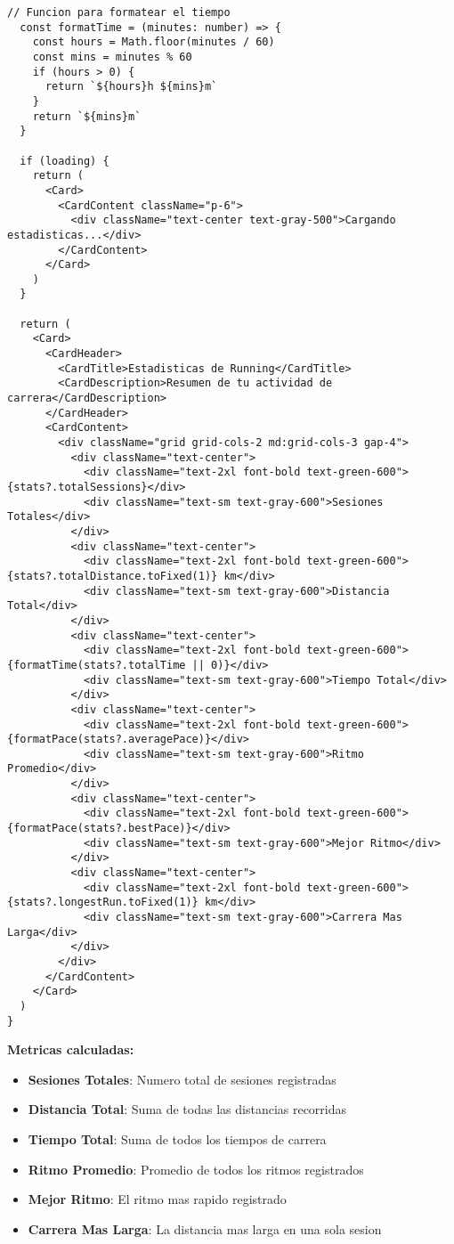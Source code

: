 \documentclass[12pt,a4paper]{article}
\begin{document}
\begin{lstlisting}[caption=components/running/running-stats.tsx - Logica de calculo]
  // Funcion para formatear el tiempo
  const formatTime = (minutes: number) => {
    const hours = Math.floor(minutes / 60)
    const mins = minutes % 60
    if (hours > 0) {
      return `${hours}h ${mins}m`
    }
    return `${mins}m`
  }

  if (loading) {
    return (
      <Card>
        <CardContent className="p-6">
          <div className="text-center text-gray-500">Cargando estadisticas...</div>
        </CardContent>
      </Card>
    )
  }

  return (
    <Card>
      <CardHeader>
        <CardTitle>Estadisticas de Running</CardTitle>
        <CardDescription>Resumen de tu actividad de carrera</CardDescription>
      </CardHeader>
      <CardContent>
        <div className="grid grid-cols-2 md:grid-cols-3 gap-4">
          <div className="text-center">
            <div className="text-2xl font-bold text-green-600">{stats?.totalSessions}</div>
            <div className="text-sm text-gray-600">Sesiones Totales</div>
          </div>
          <div className="text-center">
            <div className="text-2xl font-bold text-green-600">{stats?.totalDistance.toFixed(1)} km</div>
            <div className="text-sm text-gray-600">Distancia Total</div>
          </div>
          <div className="text-center">
            <div className="text-2xl font-bold text-green-600">{formatTime(stats?.totalTime || 0)}</div>
            <div className="text-sm text-gray-600">Tiempo Total</div>
          </div>
          <div className="text-center">
            <div className="text-2xl font-bold text-green-600">{formatPace(stats?.averagePace)}</div>
            <div className="text-sm text-gray-600">Ritmo Promedio</div>
          </div>
          <div className="text-center">
            <div className="text-2xl font-bold text-green-600">{formatPace(stats?.bestPace)}</div>
            <div className="text-sm text-gray-600">Mejor Ritmo</div>
          </div>
          <div className="text-center">
            <div className="text-2xl font-bold text-green-600">{stats?.longestRun.toFixed(1)} km</div>
            <div className="text-sm text-gray-600">Carrera Mas Larga</div>
          </div>
        </div>
      </CardContent>
    </Card>
  )
}
\end{lstlisting}

\textbf{Metricas calculadas:}
\begin{itemize}
    \item \textbf{Sesiones Totales}: Numero total de sesiones registradas
    \item \textbf{Distancia Total}: Suma de todas las distancias recorridas
    \item \textbf{Tiempo Total}: Suma de todos los tiempos de carrera
    \item \textbf{Ritmo Promedio}: Promedio de todos los ritmos registrados
    \item \textbf{Mejor Ritmo}: El ritmo mas rapido registrado
    \item \textbf{Carrera Mas Larga}: La distancia mas larga en una sola sesion
\end{itemize}
\end{document}
